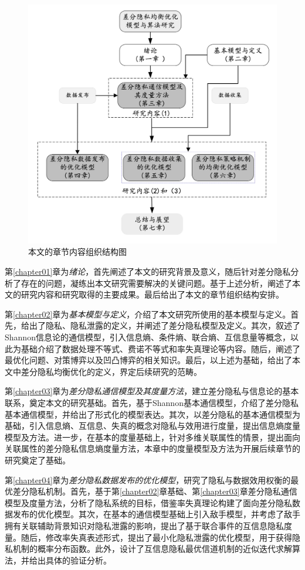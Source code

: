 \begin{figure}[htbp]
	\centering
	\includegraphics[width = 0.7\linewidth]{./figures/chapter01_2.jpg}
	\caption{本文的章节内容组织结构图}
	\label{fig:chapter1-research-structure}
\end{figure}

第\ref{chapter01}章为\textit{绪论}，首先阐述了本文的研究背景及意义，随后针对差分隐私分析了存在的问题，凝练出本文研究需要解决的关键问题。基于上述分析，阐述了本文的研究内容和研究取得的主要成果。最后给出了本文的章节组织结构安排。



第\ref{chapter02}章为{\em 基本模型与定义}，介绍了本文研究所使用的基本模型与定义。首先，给出了隐私、隐私泄露的定义，并阐述了差分隐私模型及定义。其次，叙述了Shannon信息论的通信模型，引入信息熵、条件熵、联合熵、互信息量等概念，以此为基础介绍了数据处理不等式、费诺不等式和率失真理论等内容。随后，阐述了最优化问题、对策博弈以及凹凸博弈的相关知识。最后，以上述为基础，给出了本文中差分隐私均衡优化的定义，界定后续研究的范畴。


第\ref{chapter03}章为{\em 差分隐私通信模型及其度量方法}，建立差分隐私与信息论的基本联系，奠定本文的研究基础。首先，基于Shannon基本通信模型，介绍了差分隐私基本通信模型，并给出了形式化的模型表达。其次，以差分隐私的基本通信模型为基础，引入信息熵、互信息、失真的概念对隐私与效用进行度量，提出信息熵度量模型及方法。进一步，在基本的度量基础上，针对多维关联属性的情景，提出面向关联属性的差分隐私信息熵度量方法，本章中的度量模型及方法为开展后续章节的研究奠定了基础。

第\ref{chapter04}章为{\em 差分隐私数据发布的优化模型}，研究了隐私与数据效用权衡的最优差分隐私机制。首先，基于第\ref{chapter02}章基础、第\ref{chapter03}章差分隐私通信模型及度量方法，分析了隐私系统的目标，借鉴率失真理论构建了面向差分隐私数据发布的优化模型。其次，在基本的通信模型基础上引入敌手模型，并考虑了敌手拥有关联辅助背景知识对隐私泄露的影响，提出了基于联合事件的互信息隐私度量。随后，修改率失真表述形式，提出了最小化隐私泄露的优化模型，用于获得隐私机制的概率分布函数。此外，设计了互信息隐私最优信道机制的近似迭代求解算法，并给出具体的验证分析。

